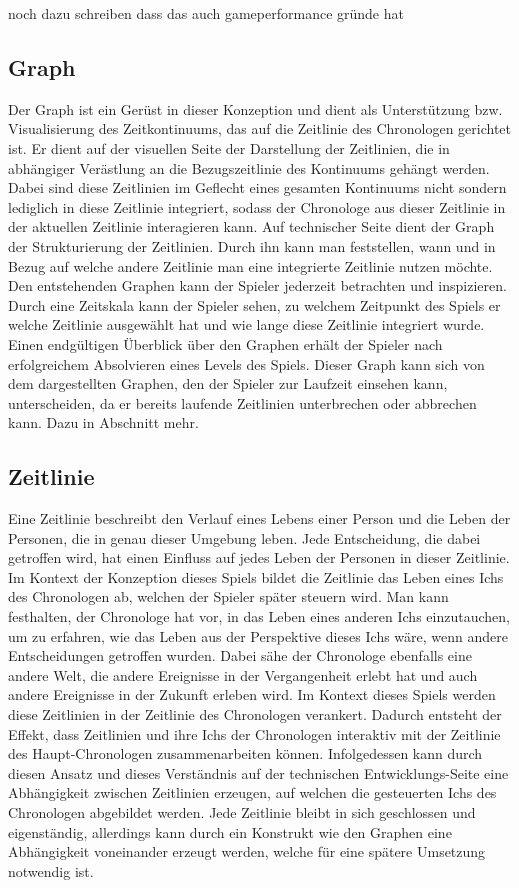 noch dazu schreiben dass das auch gameperformance gründe hat

\subsection{Graph}
Der Graph ist ein Gerüst in dieser Konzeption und dient als Unterstützung bzw. Visualisierung des Zeitkontinuums, das auf die Zeitlinie des Chronologen gerichtet ist. Er dient auf der visuellen Seite der Darstellung der  Zeitlinien, die in abhängiger Verästlung an die Bezugszeitlinie des Kontinuums gehängt werden. Dabei sind diese Zeitlinien im Geflecht eines gesamten Kontinuums nicht  sondern lediglich in diese Zeitlinie integriert, sodass der Chronologe aus dieser Zeitlinie in der aktuellen Zeitlinie interagieren kann. Auf technischer Seite dient der Graph der Strukturierung der Zeitlinien. Durch ihn kann man feststellen, wann und in Bezug auf welche andere Zeitlinie man eine integrierte Zeitlinie nutzen möchte. Den entstehenden Graphen kann der Spieler jederzeit betrachten und inspizieren. Durch eine Zeitskala kann der Spieler sehen, zu welchem Zeitpunkt des Spiels er welche Zeitlinie ausgewählt hat und wie lange diese Zeitlinie integriert wurde. Einen endgültigen Überblick über den Graphen erhält der Spieler nach erfolgreichem Absolvieren eines Levels des Spiels. Dieser Graph kann sich von dem dargestellten Graphen, den der Spieler zur Laufzeit einsehen kann, unterscheiden, da er bereits laufende Zeitlinien unterbrechen oder abbrechen kann. Dazu in Abschnitt  mehr.

\subsection{Zeitlinie}
Eine Zeitlinie beschreibt den Verlauf eines Lebens einer Person und die Leben der Personen, die in genau dieser Umgebung leben. Jede Entscheidung, die dabei getroffen wird, hat einen Einfluss auf jedes Leben der Personen in dieser Zeitlinie. Im Kontext der Konzeption dieses Spiels bildet die Zeitlinie das Leben eines Ichs des Chronologen ab, welchen der Spieler später steuern wird. Man kann festhalten, der Chronologe hat vor, in das Leben eines anderen Ichs einzutauchen, um zu erfahren, wie das Leben aus der Perspektive dieses Ichs wäre, wenn andere Entscheidungen getroffen wurden. Dabei sähe der Chronologe ebenfalls eine andere Welt, die andere Ereignisse in der Vergangenheit erlebt hat und auch andere Ereignisse in der Zukunft erleben wird. Im Kontext dieses Spiels werden diese Zeitlinien in der Zeitlinie des Chronologen verankert. Dadurch entsteht der Effekt, dass Zeitlinien und ihre Ichs der Chronologen interaktiv mit der Zeitlinie des Haupt-Chronologen zusammenarbeiten können. Infolgedessen kann durch diesen Ansatz und dieses Verständnis auf der technischen Entwicklungs-Seite eine Abhängigkeit zwischen Zeitlinien erzeugen, auf welchen die gesteuerten Ichs des Chronologen abgebildet werden. Jede Zeitlinie bleibt in sich geschlossen und eigenständig, allerdings kann durch ein Konstrukt wie den Graphen eine Abhängigkeit voneinander erzeugt werden, welche für eine spätere Umsetzung notwendig ist.

